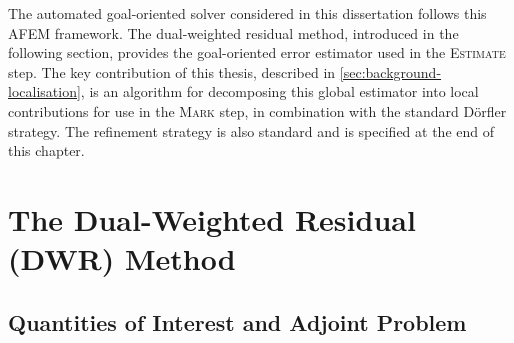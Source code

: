 The automated goal-oriented solver considered in this dissertation follows this AFEM framework. The dual-weighted residual method, introduced in the following section, provides the goal-oriented error estimator used in the \textsc{Estimate} step. The key contribution of this thesis, described in \cref{sec:background-localisation}, is an algorithm for decomposing this global estimator into local contributions for use in the \textsc{Mark} step, in combination with the standard D\"orfler strategy. The refinement strategy is also standard and is specified at the end of this chapter.



\section{The Dual-Weighted Residual (DWR) Method}
\label{sec:background-dwr}

\subsection{Quantities of Interest and Adjoint Problem}
\label{sec:background-qoi}

